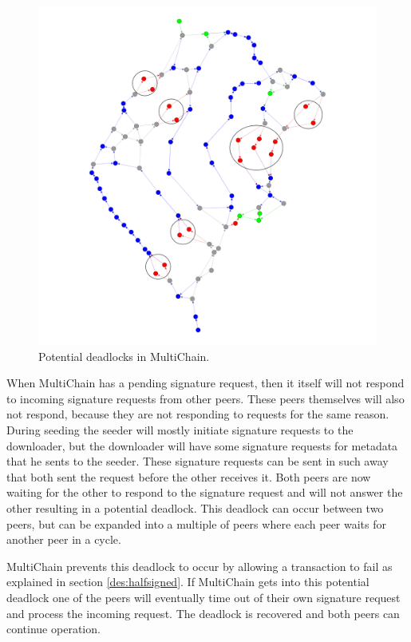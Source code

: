 \begin{figure}
	\centerline{\includegraphics[scale=0.0375]{experimentation/deadlock/deadlock.png}}
	\caption{Potential deadlocks in MultiChain.}
	\label{fig:deadlock-double}
\end{figure}


When MultiChain has a pending signature request,
then it itself will not respond to incoming signature requests from other peers.
These peers themselves will also not respond, because they are not responding to requests for the same reason.
During seeding the seeder will mostly initiate signature requests to the downloader,
but the downloader will have some signature requests for metadata that he sents to the seeder.
These signature requests can be sent in such away that both sent the request before the other receives it.
Both peers are now waiting for the other to respond to the signature request and
will not answer the other resulting in a potential deadlock.
This deadlock can occur between two peers,
but can be expanded into a multiple of peers where each peer waits for another peer in a cycle.

MultiChain prevents this deadlock to occur
by allowing a transaction to fail as explained in section \ref{des:halfsigned}.
If MultiChain gets into this potential deadlock one of the peers will eventually time out of their own signature request
and process the incoming request.
The deadlock is recovered and both peers can continue operation.
